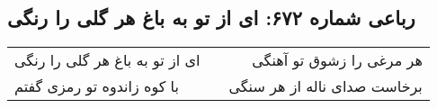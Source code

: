 \begin{center}
\section*{رباعی شماره ۶۷۲: ای از تو به باغ هر گلی را رنگی}
\label{sec:sh672}
\begin{longtable}{l p{0.5cm} r}
ای از تو به باغ هر گلی را رنگی
&&
هر مرغی را زشوق تو آهنگی
\\
با کوه زاندوه تو رمزی گفتم
&&
برخاست صدای ناله از هر سنگی
\\
\end{longtable}
\end{center}
